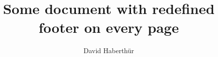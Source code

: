 \documentclass{report} %
\title{Some document with redefined footer on every page}
\author{David Haberth\"ur}
\begin{document}
\maketitle
\blinddocument
\end{document}
